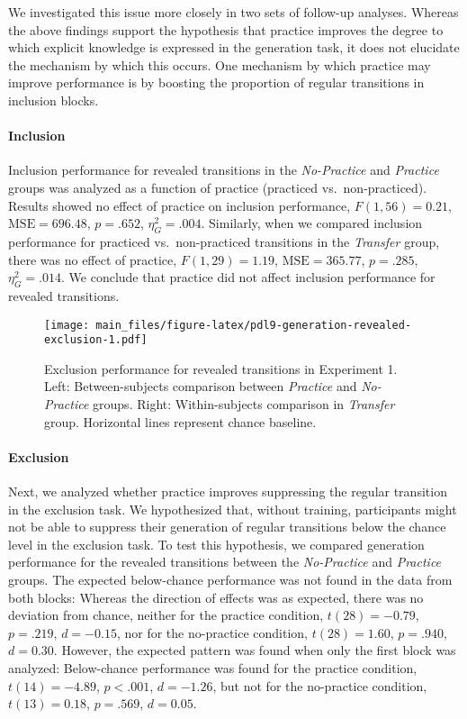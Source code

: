\documentclass[jou]{apa6}
\theoremstyle{definition}
\theoremstyle{definition}
\theoremstyle{definition}
\theoremstyle{remark}
\begin{document}
We investigated this issue more closely in two sets of follow-up
analyses. Whereas the above findings support the hypothesis that
practice improves the degree to which explicit knowledge is expressed in
the generation task, it does not elucidate the mechanism by which this
occurs. One mechanism by which practice may improve performance is by
boosting the proportion of regular transitions in inclusion blocks.

\paragraph{Inclusion}\label{inclusion-1}

Inclusion performance for revealed transitions in the \emph{No-Practice}
and \emph{Practice} groups was analyzed as a function of practice
(practiced vs.~non-practiced). Results showed no effect of practice on
inclusion performance, \(F(1, 56) = 0.21\), \(\mathrm{MSE} = 696.48\),
\(p = .652\), \(\eta^2_G = .004\). Similarly, when we compared inclusion
performance for practiced vs.~non-practiced transitions in the
\emph{Transfer} group, there was no effect of practice,
\(F(1, 29) = 1.19\), \(\mathrm{MSE} = 365.77\), \(p = .285\),
\(\eta^2_G = .014\). We conclude that practice did not affect inclusion
performance for revealed transitions.

\begin{figure}[htbp]
\centering
\texttt{[image: main\_files/figure-latex/pdl9-generation-revealed-exclusion-1.pdf]}
\caption{\label{fig:pdl9-generation-revealed-exclusion}Exclusion performance
for revealed transitions in Experiment 1. Left: Between-subjects
comparison between \emph{Practice} and \emph{No-Practice} groups. Right:
Within-subjects comparison in \emph{Transfer} group. Horizontal lines
represent chance baseline.}
\end{figure}

\paragraph{Exclusion}\label{exclusion-1}

Next, we analyzed whether practice improves suppressing the regular
transition in the exclusion task. We hypothesized that, without
training, participants might not be able to suppress their generation of
regular transitions below the chance level in the exclusion task. To
test this hypothesis, we compared generation performance for the
revealed transitions between the \emph{No-Practice} and \emph{Practice}
groups. The expected below-chance performance was not found in the data
from both blocks: Whereas the direction of effects was as expected,
there was no deviation from chance, neither for the practice condition,
\(t(28) = -0.79\), \(p = .219\), \(d = -0.15\), nor for the no-practice
condition, \(t(28) = 1.60\), \(p = .940\), \(d = 0.30\). However, the
expected pattern was found when only the first block was analyzed:
Below-chance performance was found for the practice condition,
\(t(14) = -4.89\), \(p < .001\), \(d = -1.26\), but not for the
no-practice condition, \(t(13) = 0.18\), \(p = .569\), \(d = 0.05\).
\end{document}

